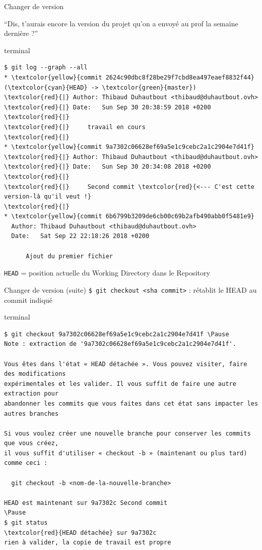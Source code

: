 \documentclass[usepdftitle=false]{beamer}
\def\seplength{.3\topsep}
\newcommand{\Pause}{%
\ifdef{\Release}
  {\pause}
  {}
}
\begin{document}
\begin{frame}[fragile]{Changer de version}
	\begin{block}{}
		\enquote{Dis, t'aurais encore la version du projet qu'on a envoyé au prof la semaine dernière ?}
	\end{block}

	\begin{beamercolorbox}[rounded=true,shadow=true]{terminal}
\vspace{-\seplength}
\begin{Verbatim}
$ git log --graph --all
* \textcolor{yellow}{commit 2624c90dbc8f28be29f7cbd8ea497eaef8832f44} (\textcolor{cyan}{HEAD} -> \textcolor{green}{master})
\textcolor{red}{|} Author: Thibaud Duhautbout <thibaud@duhautbout.ovh>
\textcolor{red}{|} Date:   Sun Sep 30 20:38:59 2018 +0200
\textcolor{red}{|}
\textcolor{red}{|}     travail en cours
\textcolor{red}{|}
* \textcolor{yellow}{commit 9a7302c06628ef69a5e1c9cebc2a1c2904e7d41f}
\textcolor{red}{|} Author: Thibaud Duhautbout <thibaud@duhautbout.ovh>
\textcolor{red}{|} Date:   Sun Sep 30 20:34:08 2018 +0200
\textcolor{red}{|}
\textcolor{red}{|}     Second commit \textcolor{red}{<--- C'est cette version-là qu'il veut !}
\textcolor{red}{|}
* \textcolor{yellow}{commit 6b6799b3209de6cb00c69b2afb490abb0f5481e9}
  Author: Thibaud Duhautbout <thibaud@duhautbout.ovh>
  Date:   Sat Sep 22 22:18:26 2018 +0200

      Ajout du premier fichier
\end{Verbatim}
	\end{beamercolorbox}

		\verb+HEAD+ = position actuelle du Working Directory dans le Repository
\end{frame}

\begin{frame}[fragile]{Changer de version (suite)}
	\verb+$ git checkout <sha commit>+ : rétablit le HEAD au commit indiqué

	\begin{beamercolorbox}[rounded=true,shadow=true]{terminal}
\vspace{-\seplength}
\begin{Verbatim}
$ git checkout 9a7302c06628ef69a5e1c9cebc2a1c2904e7d41f \Pause
Note : extraction de '9a7302c06628ef69a5e1c9cebc2a1c2904e7d41f'.

Vous êtes dans l'état « HEAD détachée ». Vous pouvez visiter, faire des modifications
expérimentales et les valider. Il vous suffit de faire une autre extraction pour
abandonner les commits que vous faites dans cet état sans impacter les autres branches

Si vous voulez créer une nouvelle branche pour conserver les commits que vous créez,
il vous suffit d'utiliser « checkout -b » (maintenant ou plus tard) comme ceci :

  git checkout -b <nom-de-la-nouvelle-branche>

HEAD est maintenant sur 9a7302c Second commit
\Pause
$ git status
\textcolor{red}{HEAD détachée} sur 9a7302c
rien à valider, la copie de travail est propre
\end{Verbatim}
	\end{beamercolorbox}
\end{frame}
\end{document}
